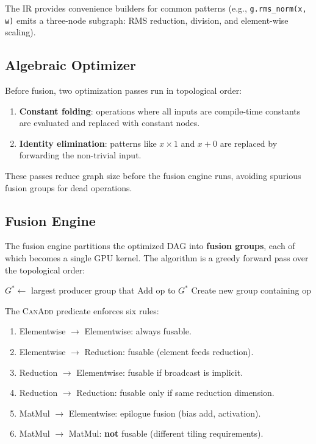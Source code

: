 \documentclass[11pt,a4paper]{article}
\begin{document}
The IR provides convenience builders for common patterns (e.g.,
\texttt{g.rms\_norm(x, w)} emits a three-node subgraph: RMS reduction,
division, and element-wise scaling).

\subsection{Algebraic Optimizer}

Before fusion, two optimization passes run in topological order:

\begin{enumerate}
  \item \textbf{Constant folding}: operations where all inputs are compile-time
    constants are evaluated and replaced with constant nodes.
  \item \textbf{Identity elimination}: patterns like $x \times 1$ and $x + 0$
    are replaced by forwarding the non-trivial input.
\end{enumerate}

These passes reduce graph size before the fusion engine runs, avoiding
spurious fusion groups for dead operations.

\subsection{Fusion Engine}

The fusion engine partitions the optimized DAG into \textbf{fusion groups},
each of which becomes a single GPU kernel. The algorithm is a greedy
forward pass over the topological order:

\begin{algorithm}[h]
\caption{Fusion Group Assignment}
\begin{algorithmic}[1]
  \State $G^* \gets$ largest producer group that 
    \State Add op to $G^*$
  \Else
    \State Create new group containing op
  \EndIf
\EndFor
\State {} 
\end{algorithmic}
\end{algorithm}

The \textsc{CanAdd} predicate enforces six rules:

\begin{enumerate}
  \item Elementwise $\to$ Elementwise: always fusable.
  \item Elementwise $\to$ Reduction: fusable (element feeds reduction).
  \item Reduction $\to$ Elementwise: fusable if broadcast is implicit.
  \item Reduction $\to$ Reduction: fusable only if same reduction dimension.
  \item MatMul $\to$ Elementwise: epilogue fusion (bias add, activation).
  \item MatMul $\to$ MatMul: \textbf{not} fusable (different tiling requirements).
\end{enumerate}
\end{document}
